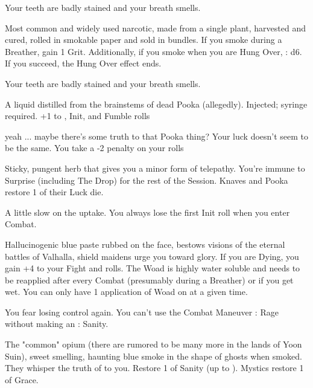 {\begin{multicols}{2}
     Your teeth are badly stained and your breath smells.



  Most common and widely used narcotic, made from a single plant, harvested and cured, rolled in smokable paper and sold in bundles.  If you smoke during a Breather, gain 1 Grit.  Additionally, if you smoke when you are Hung Over, \RS : d6.  If you succeed, the Hung Over effect ends.

    Your teeth are badly stained and your breath smells.  


  A liquid distilled from the brainstems of dead Pooka (allegedly).  Injected; syringe required.  +1 to \DEX, Init, and Fumble rolls

    yeah ... maybe there's some truth to that Pooka thing?  Your luck doesn't seem to be the same.  You take a -2 penalty on your \DEATH rolls


  Sticky, pungent herb that gives you a minor form of telepathy.  You're immune to Surprise (including The Drop) for the rest of the Session.  Knaves and Pooka restore 1 \UD of their Luck die.

    A little slow on the uptake.  You always lose the first Init roll when you enter Combat.



  Hallucinogenic blue paste rubbed on the face, bestows visions of the eternal battles of Valhalla, shield maidens urge you toward glory.  If you are Dying, you gain +4 to your Fight \RO and \DEATH rolls. The Woad is highly water soluble and needs to be reapplied after every Combat (presumably during a Breather) or if you get wet.  You can only have 1 application of Woad on at a given time.

    You fear losing control again.  You can't use the Combat Maneuver : Rage without making an \RS : Sanity.


  The "common" opium (there are rumored to be many more in the lands of Yoon Suin), sweet smelling, haunting blue smoke in the shape of ghosts when smoked.  They whisper the truth of \TheAuthority to you.  Restore 1 \UD of Sanity (up to \MAX).  Mystics restore 1 \UD of Grace.


\end{multicols}}
